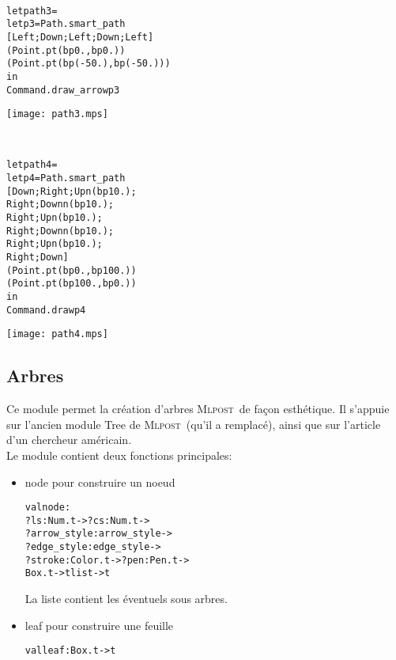 \documentclass[a4paper,12pt]{article}
\newcommand{\mlpost}{\textsc{Mlpost}}
\begin{document}
~\\
\begin{minipage}{0.5\linewidth}
  \begin{alltt}
    let path3 = 
    let p3 = Path.smart_path 
    [Left;Down;Left;Down;Left] 
    (Point.pt (bp 0.,bp 0.)) 
    (Point.pt (bp (-50.),bp (-50.)))
    in
    Command.draw_arrow p3
  \end{alltt}
\end{minipage}
\begin{minipage}{0.5\linewidth}
\begin{center}
\texttt{[image: path3.mps]}
\end{center}
\end{minipage}

~\\
\begin{minipage}{0.5\linewidth}
  \begin{alltt}
    let path4 = 
    let p4 = Path.smart_path 
    [Down;Right;Upn (bp 10.);
      Right;Downn (bp 10.);
      Right;Upn (bp 10.);
      Right;Downn (bp 10.);
      Right;Upn (bp 10.);
      Right;Down]
    (Point.pt (bp 0.,bp 100.)) 
    (Point.pt (bp 100.,bp 0.))
    in
    Command.draw p4
  \end{alltt}
\end{minipage}
\begin{minipage}{0.5\linewidth}
\begin{center}
\texttt{[image: path4.mps]}
\end{center}
\end{minipage}


\subsection{Arbres}
Ce module permet la création d'arbres \mlpost\ de façon esthétique.
Il s'appuie sur l'ancien module Tree de \mlpost\ (qu'il a remplacé), ainsi que sur l'article d'un chercheur américain. \cite{tree}
~\\
Le module contient deux fonctions principales:
\begin{itemize}
\item node pour construire un noeud
  \begin{alltt}
    val node : 
    ?ls:Num.t -> ?cs:Num.t -> 
    ?arrow_style:arrow_style -> 
    ?edge_style:edge_style -> 
    ?stroke:Color.t -> ?pen:Pen.t ->
    Box.t -> t list -> t
  \end{alltt}
  La liste contient les éventuels sous arbres.~\\
\item leaf pour construire une feuille
  \begin{alltt}
    val leaf : Box.t -> t
  \end{alltt}
\end{itemize}
\end{document}
